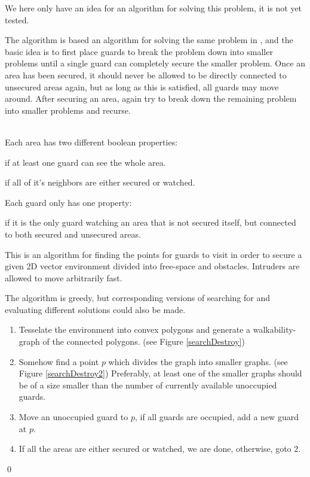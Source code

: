 We here only have an idea for an algorithm for solving this problem, it is not yet tested.

The algorithm is based an algorithm for solving the same problem in \cite{multiSearchSecure}, and the basic idea is to first place guards to break the problem down into smaller problems until a single guard can completely secure the smaller problem.
Once an area has been secured, it should never be allowed to be directly connected to unsecured areas again, but as long as this is satisfied, all guards may move around.
After securing an area, again try to break down the remaining problem into smaller problems and recurse.

\ \\
Each area has two different boolean properties:
\begin{definition}[Watched]
if at least one guard can see the whole area.
\end{definition}
\begin{definition}[Secured]
if all of it's neighbors are either secured or watched.
\end{definition}

Each guard only has one property:
\begin{definition}[Occupied]
if it is the only guard watching an area that is not secured itself, but connected to both secured and unsecured areas.
\end{definition}

\begin{algorithm}
This is an algorithm for finding the points for guards to visit in order to secure a given 2D vector environment divided into free-space and obstacles. Intruders are allowed to move arbitrarily fast.

The algorithm is greedy, but corresponding versions of searching for and evaluating different solutions could also be made.
\begin{enumerate}
	\item Tesselate the environment into convex polygons and generate a walkability-graph of the connected polygons. (see Figure \ref{searchDestroy})
	\item Somehow find a point $p$ which divides the graph into smaller graphs. (see Figure \ref{searchDestroy2})
			Preferably, at least one of the smaller graphs should be of a size smaller than the number of currently available unoccupied guards.
	\item Move an unoccupied guard to $p$, if all guards are occupied, add a new guard at $p$.
	\item If all the areas are either secured or watched, we are done, otherwise, goto 2.
\end{enumerate}
\qed
\label{algSearchDestroyIdea}
\end{algorithm}

